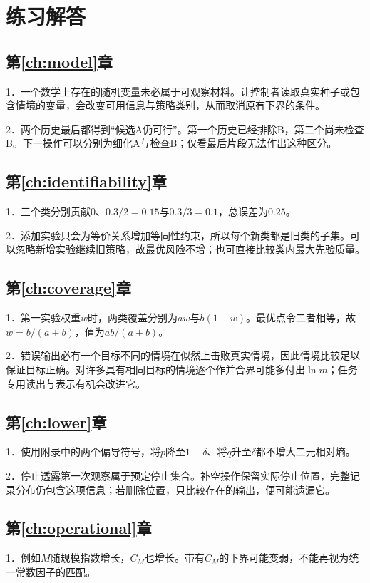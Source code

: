 \chapter{练习解答}

\section*{第\ref{ch:model}章}
1．一个数学上存在的随机变量未必属于可观察材料。让控制者读取真实种子或包含情境的变量，会改变可用信息与策略类别，从而取消原有下界的条件。

2．两个历史最后都得到“候选A仍可行”。第一个历史已经排除B，第二个尚未检查B。下一操作可以分别为细化A与检查B；仅看最后片段无法作出这种区分。

\section*{第\ref{ch:identifiability}章}
1．三个类分别贡献$0$、$0.3/2=0.15$与$0.3/3=0.1$，总误差为$0.25$。

2．添加实验只会为等价关系增加等同性约束，所以每个新类都是旧类的子集。可以忽略新增实验继续旧策略，故最优风险不增；也可直接比较类内最大先验质量。

\section*{第\ref{ch:coverage}章}
1．第一实验权重$w$时，两类覆盖分别为$aw$与$b(1-w)$。最优点令二者相等，故$w=b/(a+b)$，值为$ab/(a+b)$。

2．错误输出必有一个目标不同的情境在似然上击败真实情境，因此情境比较足以保证目标正确。对许多具有相同目标的情境逐个作并合界可能多付出$\ln m$；任务专用读出与表示有机会改进它。

\section*{第\ref{ch:lower}章}
1．使用附录中的两个偏导符号，将$p$降至$1-\delta$、将$q$升至$\delta$都不增大二元相对熵。

2．停止透露第一次观察属于预定停止集合。补空操作保留实际停止位置，完整记录分布仍包含这项信息；若删除位置，只比较存在的输出，便可能遗漏它。

\section*{第\ref{ch:operational}章}
1．例如$M$随规模指数增长，$C_M$也增长。带有$C_M$的下界可能变弱，不能再视为统一常数因子的匹配。

